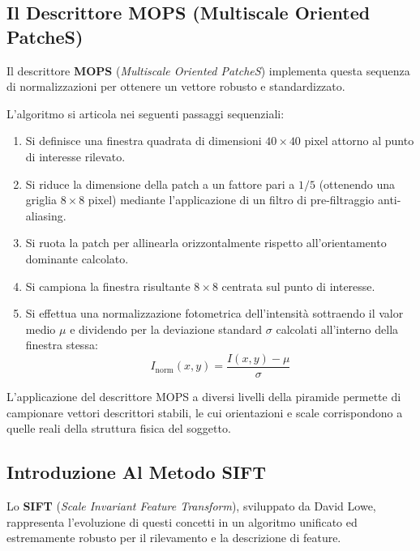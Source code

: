 ﻿\documentclass[11pt, a4paper]{article}
\begin{document}
\subsection{Il Descrittore MOPS (Multiscale Oriented PatcheS)}

Il descrittore \textbf{MOPS} (\emph{Multiscale Oriented PatcheS}) implementa questa sequenza di normalizzazioni per ottenere un vettore robusto e standardizzato.


L'algoritmo si articola nei seguenti passaggi sequenziali:
\begin{enumerate}
    \item Si definisce una finestra quadrata di dimensioni $40 \times 40$ pixel attorno al punto di interesse rilevato.
    \item Si riduce la dimensione della patch a un fattore pari a $1/5$ (ottenendo una griglia $8 \times 8$ pixel) mediante l'applicazione di un filtro di pre-filtraggio anti-aliasing.
    \item Si ruota la patch per allinearla orizzontalmente rispetto all'orientamento dominante calcolato.
    \item Si campiona la finestra risultante $8 \times 8$ centrata sul punto di interesse.
    \item Si effettua una normalizzazione fotometrica dell'intensità sottraendo il valor medio $\mu$ e dividendo per la deviazione standard $\sigma$ calcolati all'interno della finestra stessa:
    \[ I_{\text{norm}}(x, y) = \frac{I(x, y) - \mu}{\sigma} \]
\end{enumerate}


L'applicazione del descrittore MOPS a diversi livelli della piramide permette di campionare vettori descrittori stabili, le cui orientazioni e scale corrispondono a quelle reali della struttura fisica del soggetto.

\subsection{Introduzione Al Metodo SIFT}

Lo \textbf{SIFT} (\emph{Scale Invariant Feature Transform}), sviluppato da David Lowe, rappresenta l'evoluzione di questi concetti in un algoritmo unificato ed estremamente robusto per il rilevamento e la descrizione di feature.
\end{document}
